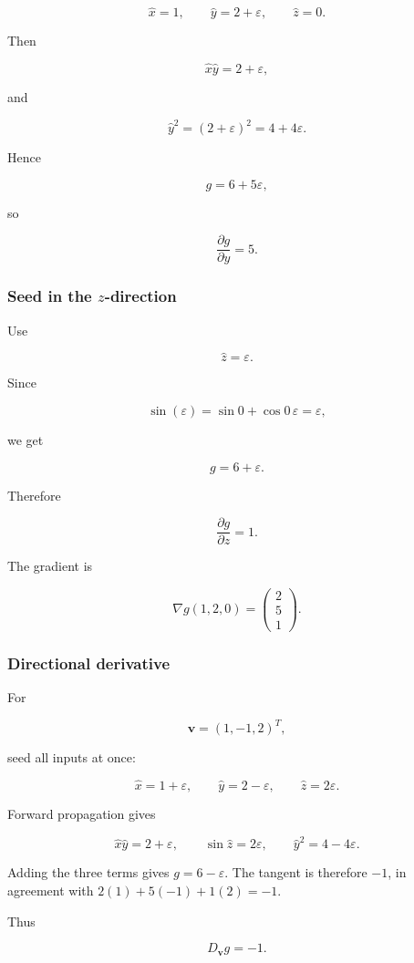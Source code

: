 \documentclass[10pt]{article}
\begin{document}
\[
\hat{x}=1,
\qquad
\hat{y}=2+\varepsilon,
\qquad
\hat{z}=0.
\]

Then

\[
\hat{x}\hat{y}=2+\varepsilon,
\]

and

\[
\hat{y}^2
=(2+\varepsilon)^2
=4+4\varepsilon.
\]

Hence

\[
g=6+5\varepsilon,
\]

so

\[
\frac{\partial g}{\partial y}=5.
\]

\subsubsection*{Seed in the $z$-direction}
Use

\[
\hat{z}=\varepsilon.
\]

Since

\[
\sin(\varepsilon)
=\sin 0+\cos 0\,\varepsilon
=\varepsilon,
\]

we get

\[
g=6+\varepsilon.
\]

Therefore

\[
\frac{\partial g}{\partial z}=1.
\]

The gradient is

\[
{
\nabla g(1,2,0)
=
\begin{pmatrix}
2\\5\\1
\end{pmatrix}
}.
\]

\subsubsection*{Directional derivative}
For

\[
\mathbf v=(1,-1,2)^T,
\]

seed all inputs at once:

\[
\hat{x}=1+\varepsilon,
\qquad
\hat{y}=2-\varepsilon,
\qquad
\hat{z}=2\varepsilon.
\]

Forward propagation gives

\[
\hat x\hat y=2+\varepsilon,\qquad
\sin\hat z=2\varepsilon,\qquad
\hat y^2=4-4\varepsilon.
\]

Adding the three terms gives $g=6-\varepsilon$. The tangent is therefore $-1$, in agreement with $2(1)+5(-1)+1(2)=-1$.

Thus

\[
{D_{\mathbf v}g=-1}.
\]
\par\endgroup
\end{document}
